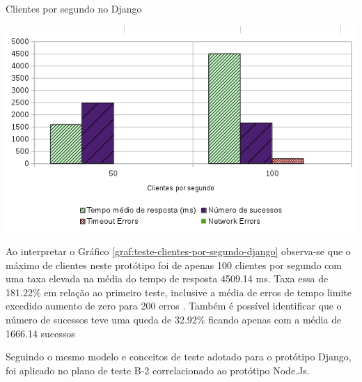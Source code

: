   \begin{grafico}[H]
    \setlength{\abovecaptionskip}{5pt}
    \setlength{\belowcaptionskip}{0pt}

    \caption[Clientes por segundo no Django]
	    {Clientes por segundo no Django}
    \centering
    \includegraphics[width=.80\textwidth]{imagem/graficos/grafico_django_plano_de_teste_2.png}
    \captionsetup[grafico]{justification=centering}
    \label{graf:teste-clientes-por-segundo-django}
  \end{grafico}

  Ao interpretar o Gráfico \ref{graf:teste-clientes-por-segundo-django}  observa-se que o máximo de clientes neste protótipo
  foi de apenas 100 clientes por segundo com uma taxa elevada na média do tempo de resposta 4509.14 ms. Taxa essa de 181.22\%
  em relação ao primeiro teste, inclusive a média de erros de tempo limite excedido aumento de zero para 200 erros .
  Também é possível identificar que o número de sucessos teve uma queda de 32.92\% ficando apenas
  com a média de 1666.14 sucessos

  Seguindo o mesmo modelo e conceitos de teste adotado para o protótipo Django, foi aplicado no plano de teste
  B-2 correlacionado ao protótipo Node.Js.

